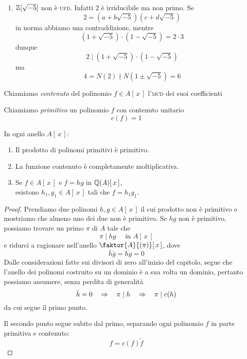 \begin{multicols}{2}
\begin{enumerate}
	\item $ \mathbb{Z}[\sqrt{-5}] $ non è \textsc{ufd}. Infatti $ 2 $ è irriducibile ma non primo.
	Se \[ 2 = (a+b\sqrt{-5})(c + d\sqrt{-5}) \] in norma abbiamo una contraddizione, mentre
	\[ (1 + \sqrt{-5})\cdot (1 - \sqrt{-5}) = 2 \cdot 3 \]
	dunque \[ 2 \mid (1 + \sqrt{-5})\cdot (1 - \sqrt{-5})  \] ma
	\[ 4 = N(2) \nmid N(1 \pm \sqrt{-5}) = 6 \]
	
\end{enumerate}

\begin{definition}
	Chiamiamo \emph{contenuto} del polinomio $ f \in A[\,x\,] $ l'\textsc{mcd} dei suoi coefficienti
\end{definition}

\begin{definition}
	Chiamiamo \emph{primitivo} un polinomio $ f $ con contenuto unitario
	\[ c(f) = 1 \]
\end{definition}
\begin{theorem}\label{LemmaGauss}
	In ogni anello $ A[\,x\,] $:
	\begin{enumerate}
	\item Il prodotto di polinomi primitivi è primitivo.
	\item La funzione contenuto è completamente moltiplicativa.
	\item Se $ f \in A[\,x\,] $ e $ f = hg $ in $ \mathbb{Q}(A)[\,x\,] $,\\ esistono $ h_1, g_1 \in A[\,x\,] $ tali che $ f = h_1g_1 $.
	\end{enumerate}
	
\end{theorem}
\begin{proof}
	Prendiamo due polinomi $ h, g \in A[\,x\,] $ il cui prodotto non è primitivo e mostriamo che almeno uno dei due non è primitivo. Se $ hg $ non è primitivo, possiamo trovare un primo $ \pi $ di $ A $ tale che
	\[ \pi \mid hg \quad\text{ in } A[\,x\,] \]
	e ridurci a ragionare nell'anello $ \faktor{A}{(\pi)}[\,x\,] $, dove
	\[ \bar{h}\bar{g} = \overline{hg} = 0 \]
	 Dalle considerazioni fatte sui divisori di zero all'inizio del capitolo, segue che l'anello dei polinomi costruito su un dominio è a sua volta un dominio, pertanto possiamo assumere, senza perdita di generalità
	 \[ \bar{h} = 0 \quad\Rightarrow\quad \pi \mid h \quad\Rightarrow\quad \pi \mid c(h) \]
	 da cui segue il primo punto.
	 
	 Il secondo punto segue subito dal primo, separando ogni polinomio $ f $ in parte primitiva e contenuto:
	 \[ f = c(f) \tilde{f} \]
	 

\end{proof}
\end{multicols}
